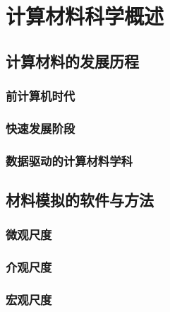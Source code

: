 \chapter{计算材料科学概述}
\section{计算材料的发展历程}
\subsection{前计算机时代}
\subsection{快速发展阶段}
\subsection{数据驱动的计算材料学科}
\section{材料模拟的软件与方法}
\subsection{微观尺度}
\subsection{介观尺度}
\subsection{宏观尺度}
